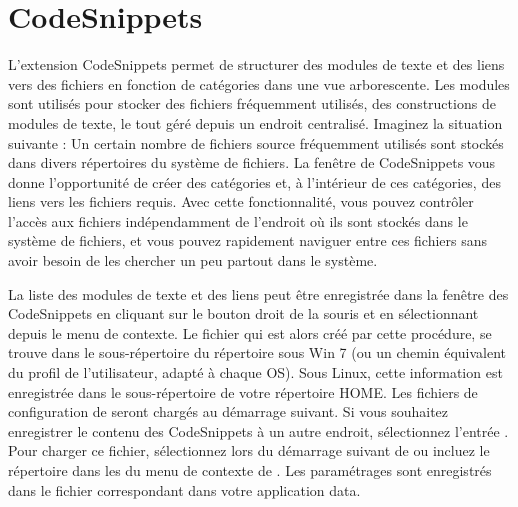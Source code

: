 \section{CodeSnippets}\label{sec:codesnippets}

L'extension CodeSnippets permet de structurer des modules de texte et des liens vers des fichiers en fonction de catégories dans une vue arborescente. Les modules sont utilisés pour stocker des fichiers fréquemment utilisés, des constructions de modules de texte, le tout géré depuis un endroit centralisé. Imaginez la situation suivante : Un certain nombre de fichiers source fréquemment utilisés sont stockés dans divers répertoires du système de fichiers. La fenêtre de CodeSnippets vous donne l'opportunité de créer des catégories et, à l'intérieur de ces catégories, des liens vers les fichiers requis. Avec cette fonctionnalité, vous pouvez contrôler l'accès aux fichiers indépendamment de l'endroit où ils sont stockés dans le système de fichiers, et vous pouvez rapidement naviguer entre ces fichiers sans avoir besoin de les chercher un peu partout dans le système.


La liste des modules de texte et des liens peut être enregistrée dans la fenêtre des CodeSnippets en cliquant sur le bouton droit de la souris et en sélectionnant  depuis le menu de contexte. Le fichier  qui est alors créé par cette procédure, se trouve dans le sous-répertoire  du répertoire  sous Win 7 (ou un chemin équivalent du profil de l'utilisateur, adapté à chaque OS). Sous Linux, cette information est enregistrée dans le sous-répertoire  de votre répertoire HOME. Les fichiers de configuration de \codeblocks seront chargés au démarrage suivant. Si vous souhaitez enregistrer le contenu des CodeSnippets à un autre endroit, sélectionnez l'entrée . Pour charger ce fichier, sélectionnez  lors du démarrage suivant de \codeblocks ou incluez le répertoire dans les  du menu de contexte de . Les paramétrages sont enregistrés dans le fichier correspondant  dans votre application data.

